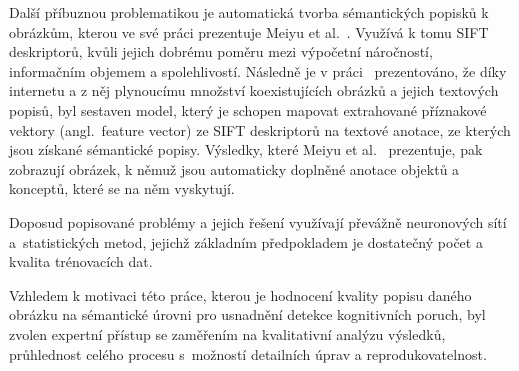 Další příbuznou problematikou je automatická tvorba sémantických popisků k obrázkům, kterou
ve své práci prezentuje Meiyu et al.~\cite{img_semantic_descr_annotation}.
Využívá k tomu SIFT~\cite{sift} deskriptorů, kvůli jejich dobrému poměru mezi výpočetní náročností, informačním objemem a spolehlivostí.
Následně je v práci~\cite{img_semantic_descr_annotation} prezentováno, že díky internetu a z něj plynoucímu množství koexistujících
obrázků a jejich textových popisů, byl sestaven model, který je schopen mapovat extrahované příznakové vektory (angl.~feature vector)
ze SIFT deskriptorů na textové anotace, ze kterých jsou získané sémantické popisy.
Výsledky, které Meiyu et al.~\cite{img_semantic_descr_annotation} prezentuje, pak zobrazují obrázek,
k němuž jsou automaticky doplněné anotace objektů a konceptů, které se na něm vyskytují.

Doposud popisované problémy a jejich řešení využívají převážně neuronových sítí a~statistických metod,
jejichž základním předpokladem je dostatečný počet a kvalita trénovacích dat.

Vzhledem k motivaci této práce, kterou je hodnocení kvality popisu daného obrázku na sémantické úrovni pro
usnadnění detekce kognitivních poruch, byl zvolen expertní přístup se zaměřením na
kvalitativní analýzu výsledků, průhlednost celého procesu s~možností detailních úprav a reprodukovatelnost.





